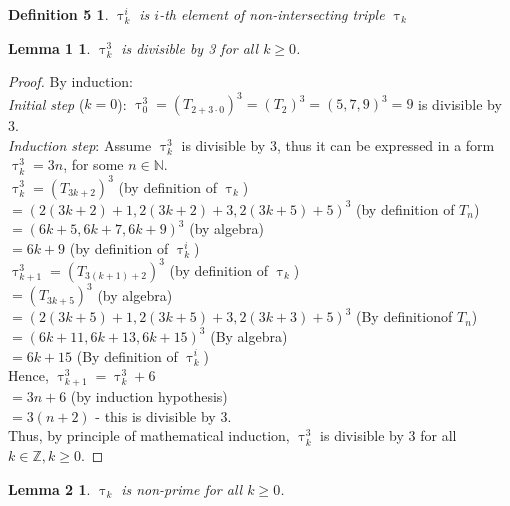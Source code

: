 \documentclass[11pt]{article}
\begin{document}
   \newtheorem*{Definition5}{Definition 5}
   \begin{Definition5}
       $\uptau_{k}^{i}$ is $i$-th element of non-intersecting triple $\uptau_{k}$
   \end{Definition5}
   \newtheorem*{Lemma1}{Lemma 1}
   \begin{Lemma1}
       $\uptau_{k}^{3}$ is divisible by 3 for all $k \geq 0$.
   \end{Lemma1}
   \begin{proof}
   By induction:\\
   \emph{Initial step} ($k = 0$): $\uptau_{0}^{3} = \left(T_{2+3\cdot0}\right)^{3} = \left(T_{2}\right)^{3} = \left(5, 7, 9\right)^{3} = 9$ is divisible by 3.\\
   \emph{Induction step}: Assume $\uptau_{k}^{3}$ is divisible by 3, thus it can be expressed in a form $\uptau_{k}^{3} = 3n$, for some $n \in \mathbb{N}$.\\
   $\uptau_{k}^{3} = (T_{3k + 2})^{3}$ (by definition of $\uptau_{k}$)\\
   $= (2(3k + 2) + 1, 2(3k + 2) + 3, 2(3k + 5) + 5)^{3}$ (by definition of $T_{n}$)\\
   $= (6k + 5, 6k + 7, 6k + 9)^{3}$ (by algebra)\\
   $= 6k + 9$ (by definition of $\uptau_{k}^{i}$)\\
   $\uptau_{k + 1}^{3} = (T_{3(k + 1) + 2})^{3}$ (by definition of $\uptau_{k}$)\\
   $= (T_{3k + 5})^{3}$ (by algebra)\\
   $= (2(3k + 5) + 1, 2(3k + 5) + 3, 2(3k + 3) + 5)^{3}$ (By definitionof $T_{n}$)\\
   $= (6k + 11, 6k + 13, 6k + 15)^{3}$ (By algebra)\\
   $= 6k + 15$ (By definition of $\uptau_{k}^{i}$)\\
   Hence, $\uptau_{k + 1}^{3} = \uptau_{k}^{3} + 6$\\
   $= 3n + 6$ (by induction hypothesis)\\
   $= 3(n + 2)$ - this is divisible by 3.\\
   Thus, by principle of mathematical induction, $\uptau_{k}^{3}$ is divisible by 3 for all $k \in \mathbb{Z}, k \geq 0$.
   \end{proof}

   \newtheorem*{Lemma2}{Lemma 2}
   \begin{Lemma2}
       $\uptau_{k}$ is non-prime for all $k \geq 0$.
   \end{Lemma2}
\end{document}
